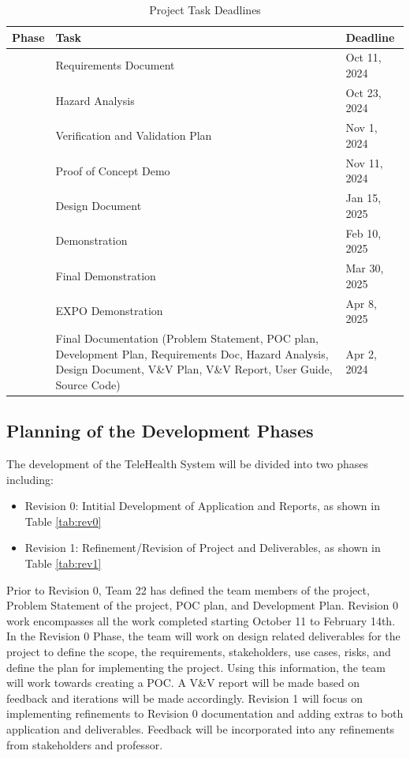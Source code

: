 \documentclass[12pt]{article}
\begin{document}
\begin{table}[h!]
  \caption{Project Task Deadlines}
  \label{tab:project_task}
  \centering
  \begin{tabular}{|>{\centering\arraybackslash}m{2.5cm}|>{\centering\arraybackslash}m{6cm}|>{\centering\arraybackslash}m{3cm}|}
  \hline
  \textbf{Phase} & \textbf{Task} & \textbf{Deadline} \\ 
  \hline
  \multirow{6}{*}{Revision 0} & Requirements Document & Oct 11, 2024 \\
  \cline{2-3}
   & Hazard Analysis & Oct 23, 2024 \\ 
  \cline{2-3}
   & Verification and Validation Plan & Nov 1, 2024 \\ 
  \cline{2-3}
   & Proof of Concept Demo & Nov 11, 2024 \\ 
  \cline{2-3}
   & Design Document & Jan 15, 2025 \\ 
  \cline{2-3}
   & Demonstration & Feb 10, 2025 \\ 
  \hline
  \multirow{3}{*}{Revision 1} & Final Demonstration & Mar 30, 2025 \\ 
  \cline{2-3}
   & EXPO Demonstration & Apr 8, 2025 \\ 
  \cline{2-3}
   & Final Documentation (Problem Statement, POC plan, Development Plan, Requirements Doc, Hazard Analysis, Design Document, V\&V Plan, V\&V Report, User Guide, Source Code) & Apr 2, 2024 \\ 
  \hline
  \end{tabular}
\end{table}

\subsection{Planning of the Development Phases}

\hspace{2em}The development of the TeleHealth System will be divided into two phases including:
\begin{itemize}
\item Revision 0: Intitial Development of Application and Reports, as shown in Table \ref{tab:rev0}
\item Revision 1: Refinement/Revision of Project and Deliverables, as shown in Table \ref{tab:rev1}
\end{itemize}
\hspace{2em}Prior to Revision 0, Team 22 has defined the team members of the project, Problem Statement of the project, POC plan, and Development Plan.
Revision 0 work encompasses all the work completed starting October 11 to February 14th. In the Revision 0 Phase, the team will work on design related deliverables for the project to define the scope, the requirements, stakeholders, use cases, risks, and define the plan for implementing the project. Using this information, the team will work towards creating a POC.
A V\&V report will be made based on feedback and iterations will be made accordingly. 
Revision 1 will focus on implementing refinements to Revision 0 documentation and adding extras to both application and deliverables. Feedback will be incorporated into any refinements from stakeholders and professor. \\
\end{document}
